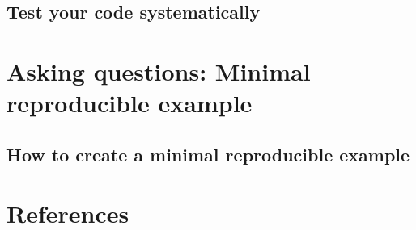 \documentclass[
]{book}
\begin{document}
\hypertarget{test-your-code-systematically}{%
\subsection{Test your code systematically}\label{test-your-code-systematically}}

\hypertarget{asking-questions-minimal-reproducible-example}{%
\section{Asking questions: Minimal reproducible example}\label{asking-questions-minimal-reproducible-example}}

\hypertarget{how-to-create-a-minimal-reproducible-example}{%
\subsection{How to create a minimal reproducible example}\label{how-to-create-a-minimal-reproducible-example}}

\hypertarget{references}{%
\section{References}\label{references}}
\end{document}
